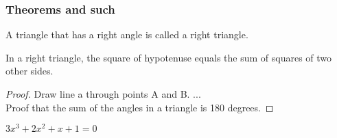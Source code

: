 \documentclass[12pt]{beamer}
\begin{document}
\begin{frame}
\frametitle{Theorems and such}
\begin{definition}
A triangle that has a right angle is called a
\alert{right triangle}.
\end{definition}
\begin{theorem}
In a right triangle, the square of hypotenuse
equals the sum of squares of two other sides.
\end{theorem}
\begin{proof}
Draw line a through points A and B. ...\\
Proof that the sum of the angles in a triangle is 180 degrees.
\end{proof}
\begin{example}
$3x^{3}+2x^{2}+x+1=0$
\end{example}
\end{frame}
\end{document}

